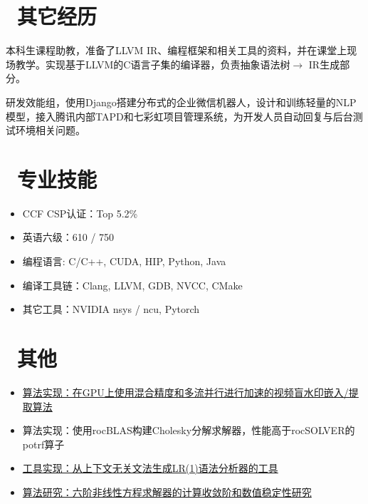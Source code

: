\documentclass{resume}
\begin{document}
\begin{onehalfspacing}
\end{onehalfspacing}

\section{\faUsers\ 其它经历}

\vspace*{0.3em}
本科生课程助教，准备了LLVM IR、编程框架和相关工具的资料，并在课堂上现场教学。实现基于LLVM的C语言子集的编译器，负责抽象语法树$\to$ IR生成部分。

\vspace*{0.3em}
研发效能组，使用Django搭建分布式的企业微信机器人，设计和训练轻量的NLP模型，接入腾讯内部TAPD和七彩虹项目管理系统，为开发人员自动回复与后台测试环境相关问题。



\section{\faCogs\ 专业技能}
\begin{itemize}[parsep=0.5ex]
  \item CCF CSP认证：Top 5.2\%
  \item 英语六级：610 / 750
  \item 编程语言: C/C++, CUDA, HIP, Python, Java
  \item 编译工具链：Clang, LLVM, GDB, NVCC, CMake
  \item 其它工具：NVIDIA nsys / ncu, Pytorch
\end{itemize}
\section{\faInfo\ 其他}
\begin{itemize}[parsep=0.5ex]
  \item \href{https://github.com/Zeege-0/Info-Security-Homework/}{算法实现：在GPU上使用混合精度和多流并行进行加速的视频盲水印嵌入/提取算法}
  \item 算法实现：使用rocBLAS构建Cholesky分解求解器，性能高于rocSOLVER的potrf算子
  \item \href{https://gitee.com/zeege/my-parser-generator}{工具实现：从上下文无关文法生成LR(1)语法分析器的工具}
  \item \href{https://github.com/Zeege-0/numerical-analysis-homework}{算法研究：六阶非线性方程求解器的计算收敛阶和数值稳定性研究}
\end{itemize}

%
%
\end{document}
